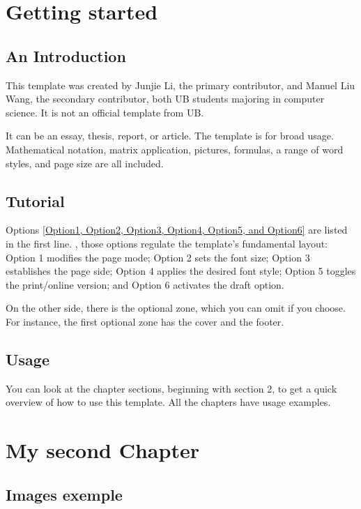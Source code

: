 \chapter{Getting started}

\section{An Introduction}
This template was created by Junjie Li, the primary contributor, and Manuel Liu Wang, the secondary contributor, both UB students majoring in computer science. It is not an official template from UB.

It can be an essay, thesis, report, or article. The template is for broad usage. Mathematical notation, matrix application, pictures, formulas, a range of word styles, and page size are all included.


\section{Tutorial}
Options \underline{[Option1, Option2, Option3, Option4, Option5, and Option6]} are listed in the first line. , those options regulate the template's fundamental layout: Option 1 modifies the page mode; Option 2 sets the font size; Option 3 establishes the page side; Option 4 applies the desired font style; Option 5 toggles the print/online version; and Option 6 activates the draft option.

On the other side, there is the optional zone, which you can omit if you choose. For instance, the first optional zone has the cover and the footer.


\section{Usage}

You can look at the chapter sections, beginning with section 2, to get a quick overview of how to use this template. All the chapters have usage examples.    




\chapter{My second Chapter}


\section{Images exemple}



